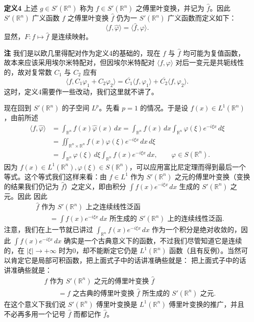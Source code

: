 \noindent\textbf{定义4}\quad
上述 $g\in S'(\mathbb R^n)$ 称为 $f\in S'(\mathbb R^n)$ 之傅里叶变换，并记为 $\widehat f$。因此 $S'(\mathbb R^n)$ 广义函数 $f$ 之傅里叶变换 $\widehat f$ 仍为一 $S'(\mathbb R^n)$ 广义函数而定义如下：
\begin{equation}
 \langle f,\widehat\varphi\rangle=\langle\widehat f,\varphi\rangle.
 \tag{24}
\end{equation}
显然，$F:f\mapsto\widehat f$ 是连续映射。

\noindent\textbf{注}\quad
我们是以欧几里得配对作为定义4的基础的，现在 $f$ 与 $\widehat f$ 均可能为复值函数，故本来应该采用埃尔米特配对，但因埃尔米特配对 $\langle f,\varphi\rangle$ 对后一变元是共轭线性的，故对复常数 $C_1$ 与 $C_2$ 应有
\[
 \langle f,C_1\varphi_1+C_2\varphi_2\rangle
 =\overline{C_1}\langle f,\varphi_1\rangle+\overline{C_2}\langle f,\varphi_2\rangle.
\]
这时，定义4需要作一些改动，我们这里就不讲了。

现在回到 $S'(\mathbb R^n)$ 的子空间 $L^p$。先看 $p=1$ 的情况。于是设 $f(x)\in L^1(\mathbb R^n)$，由前所述
\[
 \begin{aligned}
 \langle f,\widehat\varphi\rangle
 &=\int_{\mathbb R^n}f(x)\widehat\varphi(x)\,dx
 =\int_{\mathbb R^n}f(x)\,dx\int_{\mathbb R^n}\varphi(\xi)e^{-i\xi x}\,d\xi\\
 &=\iint_{\mathbb R^n\times\mathbb R^n}f(x)\varphi(\xi)e^{-i\xi x}\,dx\,d\xi\\
 &=\int_{\mathbb R^n}\varphi(\xi)\,d\xi\int_{\mathbb R^n}f(x)e^{-i\xi x}\,dx,
 \qquad \varphi\in S(\mathbb R^n).
 \end{aligned}
\]
因为 $f(x)\in L^1(\mathbb R^n),\varphi(\xi)\in S(\mathbb R^n)$，可以应用富比尼定理而得到最后一个等式。这个等式我们这样来看：由 $f\in L^1$ 作为 $S'(\mathbb R^n)$ 之元的傅里叶变换（变换的结果我们仍记为 $\widehat f$）之定义，即由积分 $\int f(x)e^{-i\xi x}\,dx$ 生成的 $S'(\mathbb R^n)$ 之元。因此
因此
\[
 \begin{aligned}
 &\widehat f\text{ 作为 }S'(\mathbb R^n)\text{ 上之连续线性泛函}\\
 &\qquad=\int f(x)e^{-i\xi x}\,dx\text{ 所生成的 }S'(\mathbb R^n)\text{ 上的连续线性泛函}.
 \end{aligned}
\]
注意，我们在上一节就已讲过 $\int_{\mathbb R^n}f(x)e^{-i\xi x}\,dx$ 作为一个积分是绝对收敛的，因此 $\int f(x)e^{-i\xi x}\,dx$ 确实是一个古典意义下的函数，不过我们尽管知道它是连续的，在 $|\xi|\to+\infty$ 时为0，却不能断定它仍是 $L^1(\mathbb R^n)$ 函数（且有反例）。当然可以肯定它是局部可积函数，把上面式子中的话讲准确些就是：
把上面式子中的话讲准确些就是：
\[
 \begin{aligned}
 &f\text{ 作为 }S'(\mathbb R^n)\text{ 之元的傅里叶变换 }\widehat f\\
 &\qquad=f\text{ 之古典的傅里叶变换 }\widehat f\text{ 所生成的 }S'(\mathbb R^n)\text{ 之元}.
 \end{aligned}
\]
在这个意义下我们说 $S'(\mathbb R^n)$ 傅里叶变换是 $L^1(\mathbb R^n)$ 傅里叶变换的推广，并且不必再多用一个记号 $\widehat f$ 而都记作 $\widehat f$。

